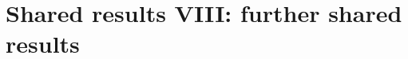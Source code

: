 \section{Shared results VIII: further shared results}\label{sec:pf:sh-misc}

\providecommand{\shmiscA}{\mathcal{A}}
\providecommand{\shmiscC}{\mathcal{C}}
\providecommand{\shmiscFm}{\mathcal{F}}
\providecommand{\shmiscLk}{\mathrm{Lk}}
\providecommand{\shmiscKP}{\mathrm{KP}}
\providecommand{\shmiscBd}{\mathrm{Bd}}
\providecommand{\shmiscQO}{\mathrm{QO}}
\providecommand{\shmiscand}{\mathbin{\wedge}}
\providecommand{\shmiscEv}{\mathrm{Ev}}
\providecommand{\shmiscLg}{\mathrm{Lg}}
\providecommand{\shmiscBu}{\mathrm{Bu}}
\providecommand{\shmiscLin}{\mathrm{Lin}}
\providecommand{\shmiscLB}{\mathrm{LB}}
\providecommand{\shmiscE}{\mathcal{E}}
\providecommand{\shmiscTrue}{\mathrm{True}}
\providecommand{\shmiscIrr}{\operatorname{Irr}}
\providecommand{\shmiscKone}{\mathrm{K}_1}
\providecommand{\shmiscGo}{\ensuremath{(\mathrm{G}^\circ)}}
\providecommand{\shmiscS}{\mathcal S}
\providecommand{\shmiscR}{\mathcal R}
\providecommand{\shmiscX}{\mathsf X}
\providecommand{\shmiscXO}{\mathsf X_{\OO}}
\providecommand{\shmiscla}{\lambda}

